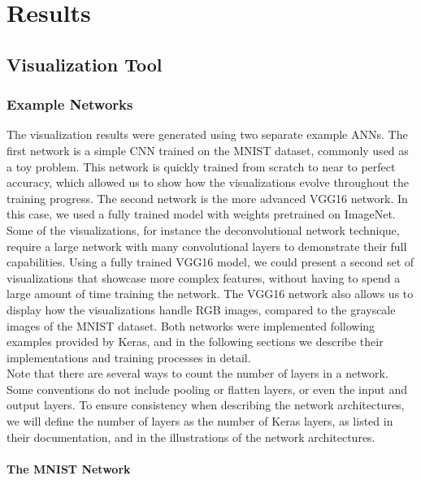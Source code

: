 
\chapter{Results} \label{results-chapter}

\section{Visualization Tool}

\subsection{Example Networks}

The visualization results were generated using two separate example ANNs. The first network is a simple CNN trained on the MNIST dataset, commonly used as a toy problem. This network is quickly trained from scratch to near to perfect accuracy, which allowed us to show how the visualizations evolve throughout the training progress. The second network is the more advanced VGG16 network. In this case, we used a fully trained model with weights pretrained on ImageNet. Some of the visualizations, for instance the deconvolutional network technique, require a large network with many convolutional layers to demonstrate their full capabilities. Using a fully trained VGG16 model, we could present a second set of visualizations that showcase more complex features, without having to spend a large amount of time training the network. The VGG16 network also allows us to display how the visualizations handle RGB images, compared to the grayscale images of the MNIST dataset. Both networks were implemented following examples provided by Keras, and in the following sections we describe their implementations and training processes in detail.\\

\noindent Note that there are several ways to count the number of layers in a network. Some conventions do not include pooling or flatten layers, or even the input and output layers. To ensure consistency when describing the network architectures, we will define the number of layers as the number of Keras layers, as listed in their documentation, and in the illustrations of the network architectures.

\subsubsection{The MNIST Network}

